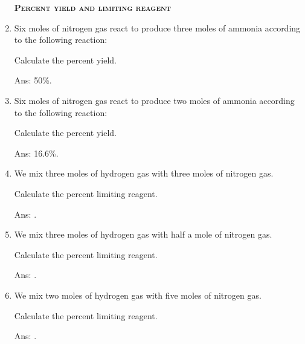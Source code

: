 \documentclass[main.tex]{subfiles}
\begin{document}
\begin{multicols*}{2}
\begin{enumerate}
{\raggedright\textsc{\textbf{Percent yield and limiting reagent}}\par}



\item Six moles of nitrogen gas react to produce three moles of ammonia according to the following reaction:
\begin{center}  \end{center}
Calculate the percent yield.
\begin{flushright}\small Ans: 50\%.\end{flushright}

\item Six moles of nitrogen gas react to produce two moles of ammonia according to the following reaction:
\begin{center}  \end{center}
Calculate the percent yield.
\begin{flushright}\small Ans: 16.6\%.\end{flushright}

\item We mix three moles of hydrogen gas with three moles of nitrogen gas.
\begin{center}  \end{center}
Calculate the percent limiting reagent.
\begin{flushright}\small Ans: .\end{flushright}

\item We mix three moles of hydrogen gas with half a mole of nitrogen gas.
\begin{center}  \end{center}
Calculate the percent limiting reagent.
\begin{flushright}\small Ans: .\end{flushright}

\item We mix two moles of hydrogen gas with five moles of nitrogen gas.
\begin{center}  \end{center}
Calculate the percent limiting reagent.
\begin{flushright}\small Ans: .\end{flushright}



\end{enumerate}
\end{multicols*}
\end{document}
